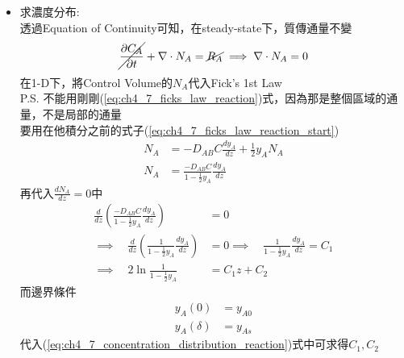 \documentclass[../main.tex]{subfiles}
\begin{document}
\begin{itemize}
\begin{itemize}
\begin{equation}
      \end{equation}
      P.S. 如果為1級反應
      \begin{equation}
        N_A\big|_{z=\delta} = k C_{As} = k C y_{As} \implies y_{As} = \frac{N_A(\delta)}{kC}
      \end{equation}
      代入(\ref{eq:ch4_7_ficks_law_reaction})得
      \begin{equation}
        N_A = \frac{-2D_{AB}C}{\delta}
         \ln\left(\frac{1-\frac{1}{2}\frac{N_A(\delta)}{kC}}{1-\frac{1}{2}y_{A0}}\right)
      \end{equation}
      這時$N_A$無法直接求出，需要用Try-and-Error的方法求解
    \item 求濃度分布:\\
    透過Equation of Continuity可知，在steady-state下，質傳通量不變
    \begin{equation}
      \cancel{\frac{\partial C_A}{\partial t}} +\nabla \cdot N_A = \cancel{R_A}
      \implies \nabla \cdot N_A = 0
    \end{equation}
    在1-D下，將Control Volume的$N_A$代入Fick's 1st Law\\
    P.S. 不能用剛剛(\ref{eq:ch4_7_ficks_law_reaction})式，因為那是整個區域的通量，不是局部的通量\\
    要用在他積分之前的式子(\ref{eq:ch4_7_ficks_law_reaction_start})
    \begin{align}
      N_A &= -D_{AB}C\frac{d y_A}{dz}+ \frac{1}{2}y_A N_A \nonumber\\
      N_A &= \frac{-D_{AB}C}{1-\frac{1}{2}y_A}\frac{d y_A}{dz} \label{eq:ch4_7_ficks_law_reaction_local}
    \end{align}
    再代入$\frac{d N_A}{dz} = 0$中
    \begin{align}
      \frac{d}{dz}\left(
        \frac{-D_{AB}C}{1-\frac{1}{2}y_A}\frac{d y_A}{dz}
      \right) &= 0 \nonumber \\
      \implies \quad \frac{d}{dz}\left(
        \frac{1}{1-\frac{1}{2}y_A}\frac{d y_A}{dz}
      \right) &= 0
      \implies \quad 
      \frac{1}{1-\frac{1}{2}y_A}\frac{d y_A}{dz} = C_1 \nonumber\\
      \implies \quad 
      2 \ln \frac{1}{1-\frac{1}{2}y_A} &= C_1 z + C_2 \label{eq:ch4_7_concentration_distribution_reaction}
    \end{align}
    而邊界條件
    \begin{align}
      y_A(0) &= y_{A0} \\
      y_A(\delta) &= y_{As}
    \end{align}
    代入(\ref{eq:ch4_7_concentration_distribution_reaction})式中可求得$C_1, C_2$

\end{itemize}
\end{itemize}
\end{document}

